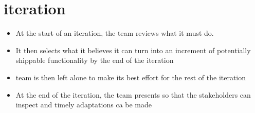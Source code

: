 \section{iteration}


\begin{itemize}
  \item At the start of an iteration, the team reviews what it must do. 
  \item It then selects what it believes it can turn into an increment of potentially shippable functionality by the end of the iteration
  \item team is then left alone to make its best effort for the rest of the iteration
  \item At the end of the iteration, the team presents so that the stakeholders can inspect and timely adaptations ca be made
\end{itemize}
